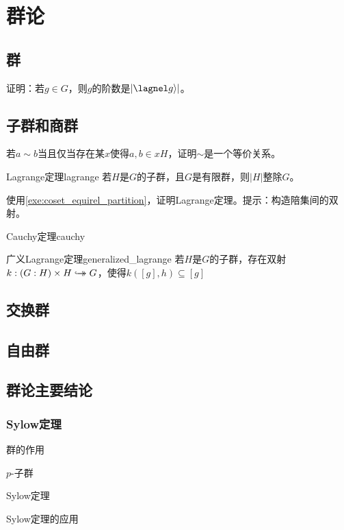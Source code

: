 \documentclass[../main.tex]{subfiles}
\begin{document}
\setcounter{chapter}{2}
\chapter{群论}
\section{群}
\begin{exercise}\label{exe:order_and_cyclic_subgroup}
证明：若$g\in G$，则$g$的阶数是$|\lagnel g\rangle|$。
\end{exercise}
\section{子群和商群}
\begin{exercise}\label{exe:coset_equirel_partition}
若$a\sim b$当且仅当存在某$x$使得$a,b\in xH$，证明$\sim$是一个等价关系。
\end{exercise}
\begin{proposition}{Lagrange定理}{lagrange}
若$H$是$G$的子群，且$G$是有限群，则$|H|$整除$G$。
\end{proposition}
\begin{exercise}
使用\ref{exe:coset_equirel_partition}，证明Lagrange定理。提示：构造陪集间的双射。
\end{exercise}
\begin{proposition}{Cauchy定理}{cauchy}

\end{proposition}
\begin{theorem}{广义Lagrange定理}{generalized_lagrange}
若$H$是$G$的子群，存在双射$k:(G:H)\times H\hookrightarrow\mathrel{\mspace{-15mu}}\rightarrow G$，使得$k([g],h)\subseteq[g]$
\end{theorem}
\section{交换群}
\section{自由群}
\section{群论主要结论}
\subsection{Sylow定理}
\begin{introduction}
\item 群的作用
\item $p$-子群
\item Sylow定理
\item Sylow定理的应用
\end{introduction}
\end{document}
